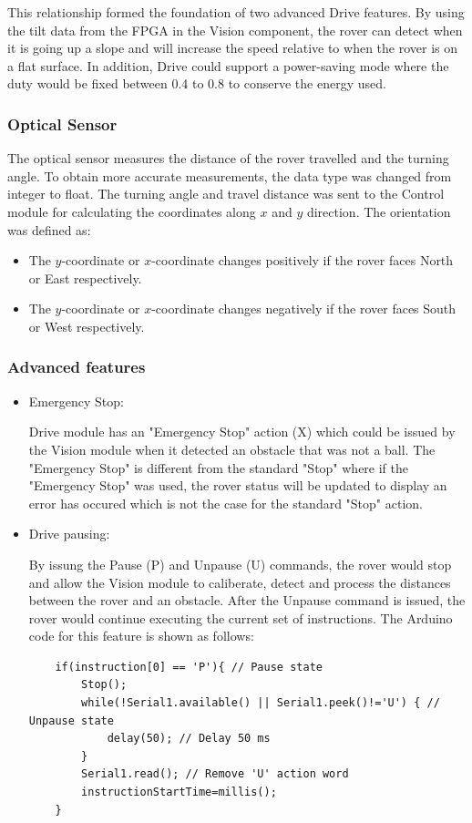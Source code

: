 \documentclass[11pt, a4paper]{article}
\begin{document}
This relationship formed the foundation of two advanced Drive features. By using the tilt data from the FPGA in the Vision component, the rover can detect when it is going up a slope and will increase the speed relative to when the rover is on a flat surface. In addition, Drive could support a power-saving mode where the duty would be fixed between 0.4 to 0.8 to conserve the energy used.

\pagebreak

\subsubsection{Optical Sensor}

The optical sensor measures the distance of the rover travelled and the turning angle. To obtain more accurate measurements, the data type was changed from integer to float. The turning angle and travel distance was sent to the Control module for calculating the coordinates along $x$ and $y$ direction. The orientation was defined as:
\begin{itemize}
    \item The $y$-coordinate or $x$-coordinate changes positively if the rover faces North or East respectively.
    \item The $y$-coordinate or $x$-coordinate changes negatively if the rover faces South or West respectively.
\end{itemize}

\subsubsection{Advanced features}

\begin{itemize}
    \item Emergency Stop:
    
    Drive module has an "Emergency Stop" action (X) which could be issued by the Vision module when it detected an obstacle that was not a ball. The "Emergency Stop" is different from the standard "Stop" where if the "Emergency Stop" was used, the rover status will be updated to display an error has occured which is not the case for the standard "Stop" action. 

    \item Drive pausing:
    
    By issung the Pause (P) and Unpause (U) commands, the rover would stop and allow the Vision module to caliberate, detect and process the distances between the rover and an obstacle. After the Unpause command is issued, the rover would continue executing the current set of instructions. The Arduino code for this feature is shown as follows:
    \begin{lstlisting}
    if(instruction[0] == 'P'){ // Pause state
        Stop();
        while(!Serial1.available() || Serial1.peek()!='U') { // Unpause state
            delay(50); // Delay 50 ms
        }
        Serial1.read(); // Remove 'U' action word
        instructionStartTime=millis();
    }
    \end{lstlisting}
\end{itemize}
\end{document}
